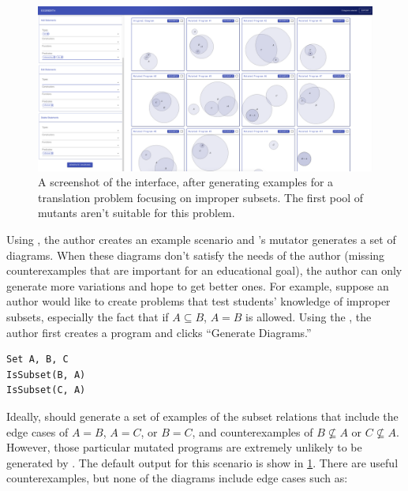 \begin{figure}
    \centering
    \includegraphics[width=\linewidth]{assets/appendix/edgeworth-bad-output.pdf}
    \caption{A screenshot of the \Edgeworth interface, after generating examples for a translation problem focusing on improper subsets. The first pool of mutants aren't suitable for this problem.}
    \label{fig:edgeworth-bad-output}
\end{figure}

Using \Edgeworth, the author creates an example scenario and \Edgeworth's mutator generates a set of diagrams. When these diagrams don't satisfy the needs of the author (\eg missing counterexamples that are important for an educational goal), the author can only generate more variations and hope to get better ones. For example, suppose an author would like to create problems that test students' knowledge of improper subsets, especially the fact that if $A \subseteq B$, $A = B$ is allowed. Using the \Edgeworth, the author first creates a \Substance program and clicks ``Generate Diagrams.'' 

\noindent\hspace*{\fill}
\begin{minipage}[c]{0.23\columnwidth}
\begin{mdframed}[style=SUBCode]
\begin{lstlisting}[language=Sub-SET,escapechar=@,numbers=none]
Set A, B, C
IsSubset(B, A)
IsSubset(C, A)
\end{lstlisting}
\end{mdframed}
\end{minipage}
\hspace*{\fill}

Ideally, \Edgeworth should generate a set of examples of the subset relations that include the edge cases of $A = B$, $A = C$, or $B = C$, and counterexamples of $B \not\subseteq A$ or $C \not\subseteq A$. However, those particular mutated programs are extremely unlikely to be generated by \Edgeworth. The default \Edgeworth output for this scenario is show in  \cref{fig:edgeworth-bad-output}. There are useful counterexamples, but none of the diagrams include edge cases such as:

